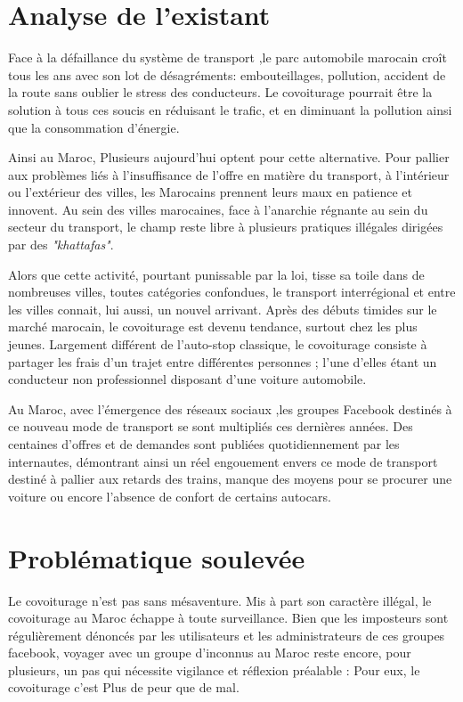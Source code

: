 \documentclass[a4paper]{report}
\begin{document}
\begin{spacing}{2}
\section{Analyse de l'existant}

\par 
Face à la défaillance du système de transport ,le parc automobile marocain croît tous les ans avec son lot de désagréments: embouteillages, pollution, accident de la route sans oublier le stress des conducteurs. Le covoiturage pourrait être la solution à tous ces soucis en réduisant le trafic, et en diminuant la pollution ainsi que la consommation d’énergie.

Ainsi au Maroc, Plusieurs aujourd'hui optent pour cette alternative. Pour pallier aux problèmes liés à l’insuffisance de l’offre en matière du transport, à l’intérieur ou l’extérieur des villes, les Marocains prennent leurs maux en patience et innovent. Au sein des villes marocaines, face à l’anarchie régnante au sein du secteur du transport, le champ reste libre à plusieurs pratiques illégales dirigées par des \textit{"khattafas"}.

Alors que cette activité, pourtant punissable par la loi, tisse sa toile dans de nombreuses villes, toutes catégories confondues, le transport interrégional et entre les villes connait, lui aussi, un nouvel arrivant. Après des débuts timides sur le marché marocain, le covoiturage est devenu tendance, surtout chez les plus jeunes. Largement différent de l'auto-stop classique, le covoiturage consiste à partager les frais d’un trajet entre différentes personnes ; l’une d’elles étant un conducteur non professionnel disposant d’une voiture automobile.

Au Maroc, avec l’émergence des réseaux sociaux ,les groupes Facebook destinés à ce nouveau mode de transport se sont multipliés ces dernières années. Des centaines d’offres et de demandes sont publiées quotidiennement par les internautes, démontrant ainsi un réel engouement envers ce mode de transport destiné à pallier aux retards des trains, manque des moyens pour se procurer une voiture ou encore l’absence de confort de certains autocars.


\section{Problématique soulevée}
\par 
Le covoiturage n’est pas sans mésaventure. Mis à part son caractère illégal, le covoiturage au Maroc échappe à toute surveillance. Bien que les imposteurs sont régulièrement dénoncés par les utilisateurs et les administrateurs de ces groupes facebook, voyager avec un groupe d’inconnus au Maroc reste encore, pour plusieurs, un pas qui nécessite vigilance et réflexion préalable : Pour eux, le covoiturage c'est \textsf{Plus de peur que de mal}.


\end{spacing}
\end{document}
